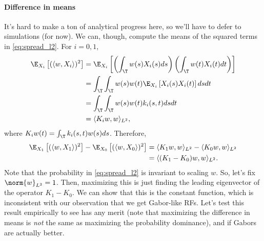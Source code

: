 \documentclass{article}
\begin{document}
\paragraph*{Difference in means}
It's hard to make a ton of analytical progress here, so we'll have to defer to simulations (for now).
We can, though, compute the means of the squared terms in \cref{eq:spread_l2}.
For $i=0,1$,
\begin{align*}
  \E_{X_i} \left[ (\langle w, X_i \rangle)^2 \right]
  &= \E_{X_i} \left[ \left( \int_{\T} w(s) X_i(s) ds \right) \left( \int_{\T} w(t) X_i(t) dt \right) \right] \\
  &= \int_{\T} \int_{\T} w(s) w(t) \E_{X_i} \left[ X_i(s) X_i(t) \right] ds dt \\
  &= \int_{\T} \int_{\T} w(s) w(t) k_i(s,t) ds dt \\
  &= \langle K_i w, w \rangle_{L^2},
\end{align*}
where $K_i w(t) = \int_{\T} k_i(s,t) w(s) ds$.
Therefore,
\begin{align*}
  \E_{X_1} \left[ (\langle w, X_1 \rangle)^2 \right]
  - \E_{X_0} \left[ (\langle w, X_0 \rangle)^2 \right]
  &= \langle K_1 w, w \rangle_{L^2} - \langle K_0 w, w \rangle_{L^2} \\
  &= \langle (K_1 - K_0) w, w \rangle_{L^2}.
\end{align*}
Note that the probability in \cref{eq:spread_l2} is invariant to scaling $w$.
So, let's fix $\norm{w}_{L^2} = 1$.
Then, maximizing this is just finding the leading eigenvector of the operator $K_1 - K_0$.
We can show that this is the constant function, which is inconsistent with our observation that we get Gabor-like RFs.
Let's test this result empirically to see has any merit (note that maximizing the difference in means is \emph{not} the same as maximizing the probability dominance), and if Gabors are actually better.
\end{document}
